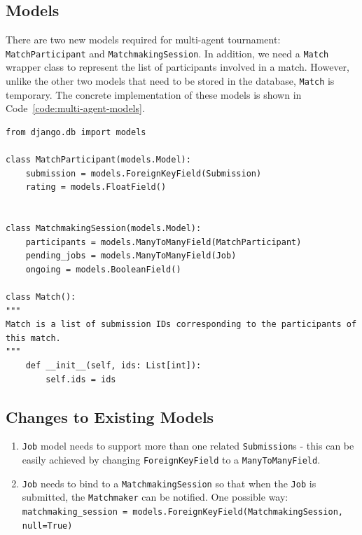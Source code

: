 \subsection{Models}
There are two new models required for multi-agent tournament: \texttt{MatchParticipant} and \texttt{MatchmakingSession}. In addition, we need a \texttt{Match} wrapper class to represent the list of participants involved in a match. However, unlike the other two models that need to be stored in the database, \texttt{Match} is temporary. The concrete implementation of these models is shown in Code~\ref{code:multi-agent-models}.

\begin{code}
\begin{verbatim}
from django.db import models

class MatchParticipant(models.Model):
    submission = models.ForeignKeyField(Submission)
    rating = models.FloatField()
    

class MatchmakingSession(models.Model):
    participants = models.ManyToManyField(MatchParticipant)
    pending_jobs = models.ManyToManyField(Job)
    ongoing = models.BooleanField()

class Match():
"""
Match is a list of submission IDs corresponding to the participants of this match.
"""
    def __init__(self, ids: List[int]):
        self.ids = ids
\end{verbatim}
\label{code:multi-agent-models}
\end{code}

\subsection{Changes to Existing Models}
\begin{enumerate}
    \item \texttt{Job} model needs to support more than one related \texttt{Submission}s - this can be easily achieved by changing \texttt{ForeignKeyField} to a \texttt{ManyToManyField}.
    \item \texttt{Job} needs to bind to a \texttt{MatchmakingSession} so that when the \texttt{Job} is submitted, the \texttt{Matchmaker} can be notified. One possible way:\\ \texttt{matchmaking\_session = models.ForeignKeyField(MatchmakingSession, null=True)}
\end{enumerate}

